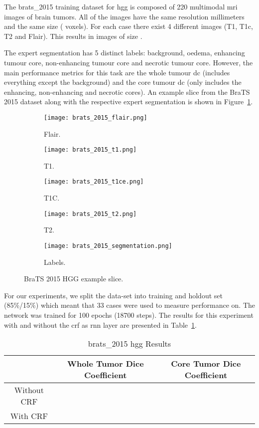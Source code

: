 \documentclass{article}
\begin{document}
The \gls{brats_2015} \cite{BRATS_2015} training dataset for \gls{hgg} is composed of 220 multimodal \gls{mri} images of brain tumors.
All of the images have the same resolution  millimeters and the same size ( voxels). 
For each case there exist 4 different images (T1, T1c, T2 and Flair).
This results in images of size .

The expert segmentation has 5 distinct labels: background, oedema, enhancing tumour core, non-enhancing tumour core and necrotic tumour core.
However, the main performance metrics for this task are the whole tumour \gls{dc} (includes everything except the background) and the core tumour \gls{dc} (only includes the enhancing, non-enhancing and necrotic cores).
An example slice from the BraTS 2015 dataset along with the respective expert segmentation is shown in Figure~\ref{fig:brats_2015}.

\begin{figure}[ht]
\centering
\begin{subfigure}{.2\textwidth}
  \centering
  \texttt{[image: brats\_2015\_flair.png]}
  \caption{Flair.}
\end{subfigure}\begin{subfigure}{.2\textwidth}
  \centering
  \texttt{[image: brats\_2015\_t1.png]}
  \caption{T1.}
\end{subfigure}\begin{subfigure}{.2\textwidth}
  \centering
  \texttt{[image: brats\_2015\_t1ce.png]}
  \caption{T1C.}
\end{subfigure}\begin{subfigure}{.2\textwidth}
  \centering
  \texttt{[image: brats\_2015\_t2.png]}
  \caption{T2.}
\end{subfigure}\begin{subfigure}{.2\textwidth}
  \centering
  \texttt{[image: brats\_2015\_segmentation.png]}
  \caption{Labels.}
\end{subfigure}
\caption{BraTS 2015 HGG example slice.}
\label{fig:brats_2015}
\end{figure}


For our experiments, we split the data-set into training and holdout set (85\%/15\%) which meant that 33 cases were used to measure performance on.
The network was trained for 100 epochs (18700 steps).
The results for this experiment with and without the \gls{crf} as \gls{rnn} layer are presented in Table~\ref{tab:brats_2015}.

\begin{table}[!h]
\centering
\caption{\gls{brats_2015} \gls{hgg} Results}
\label{tab:brats_2015}
\begin{tabular}{@{}ccc@{}}
\toprule
            & Whole Tumor Dice Coefficient        & Core Tumor Dice Coefficient         \\ \midrule
Without CRF &    &                                    \\
With CRF    &    &                                    \\ \bottomrule
\end{tabular}
\end{table}
\end{document}
